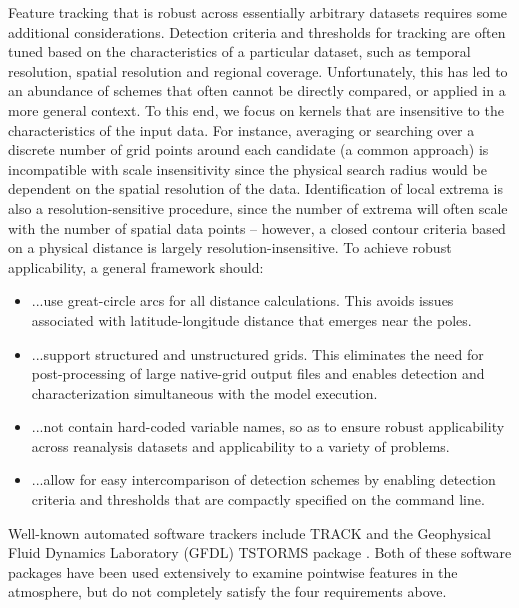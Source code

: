 \documentclass[gmdd, hvmath, online]{copernicus_discussions}
\begin{document}
Feature tracking that is robust across essentially arbitrary datasets requires some additional considerations.  Detection criteria and thresholds for tracking are often tuned based on the characteristics of a particular dataset, such as temporal resolution, spatial resolution and regional coverage.  Unfortunately, this has led to an abundance of schemes that often cannot be directly compared, or applied in a more general context.  To this end, we focus on kernels that are insensitive to the characteristics of the input data. For instance, averaging or searching over a discrete number of grid points around each candidate (a common approach) is incompatible with scale insensitivity since the physical search radius would be dependent on the spatial resolution of the data.  Identification of local extrema is also a resolution-sensitive procedure, since the number of extrema will often scale with the number of spatial data points -- however, a closed contour criteria based on a physical distance is largely resolution-insensitive.  To achieve robust applicability, a general framework should:
\begin{itemize}
\item[] ...use great-circle arcs for all distance calculations.  This avoids issues associated with latitude-longitude distance that emerges near the poles.
\item[] ...support structured and unstructured grids.  This eliminates the need for post-processing of large native-grid output files and enables detection and characterization simultaneous with the model execution.
\item[] ...not contain hard-coded variable names, so as to ensure robust applicability across reanalysis datasets and applicability to a variety of problems.
\item[] ...allow for easy intercomparison of detection schemes by enabling detection criteria and thresholds that are compactly specified on the command line.
\end{itemize}  Well-known automated software trackers include TRACK \citep{hodges1994general, hodges1995feature, hodges2015track} and the Geophysical Fluid Dynamics Laboratory (GFDL) TSTORMS package \citep{vitart1997simulation}.  Both of these software packages have been used extensively to examine pointwise features in the atmosphere, but do not completely satisfy the four requirements above.

\end{document}
